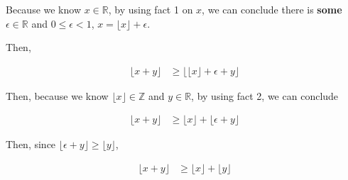 \documentclass[12pt]{article}
\begin{document}
\begin{itemize}
\begin{mdframed}
        Because we know $x \in \mathbb{R}$, by using fact 1 on $x$, we can conclude there
        is \color{red}\textbf{some}\color{black}\:$\epsilon \in \mathbb{R}$ and $0
        \leq \epsilon < 1$, $x = \lfloor x \rfloor + \epsilon$.

        \bigskip

        Then,

        \setcounter{equation}{0}
        \begin{align}
            \lfloor x + y \rfloor &\geq \bigl\lfloor \lfloor x \rfloor + \epsilon + y \bigr\rfloor
        \end{align}

        \bigskip

        Then, because we know $\lfloor x \rfloor \in \mathbb{Z}$ and $y \in \mathbb{R}$,
        by using fact 2, we can conclude

        \begin{align}
            \lfloor x + y \rfloor &\geq \lfloor x \rfloor + \lfloor \epsilon + y \rfloor
        \end{align}

        \bigskip

        Then, since $\lfloor \epsilon + y \rfloor \geq \lfloor y \rfloor$,

        \begin{align}
            \lfloor x + y \rfloor &\geq \lfloor x \rfloor + \lfloor y \rfloor
        \end{align}
    \end{mdframed}

\end{itemize}
\end{document}
